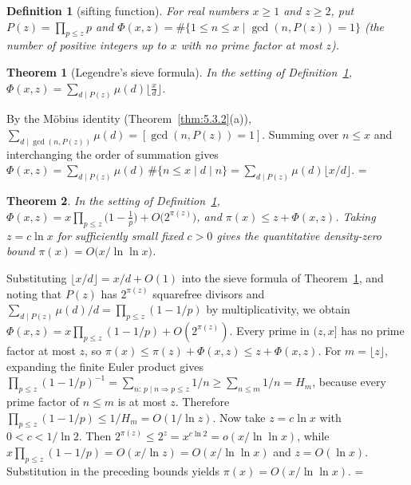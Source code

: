 \documentclass[11pt]{article}
\makeatletter
\let\nt@closedisplay\]
\def\nt@guardedclose{\@ifnextchar\par{\nt@closeafterpar}{\@ifnextchar\end{\postdisplaypenalty\@M\nt@closedisplay}{\nt@closedisplay}}}
\def\nt@closeafterpar\par{\@ifnextchar\par{\nt@closeafterpar}{\@ifnextchar\end{\postdisplaypenalty\@M\nt@closedisplay\par}{\nt@closedisplay\par}}}
\renewenvironment{proof}[1][\proofname]{\par
  \pushQED{\qed}\normalfont\topsep\medskipamount\edef\nt@afterproof{\@endparpenalty=\the\@endparpenalty\relax}\@beginparpenalty\@M\@endparpenalty\@M\let\]\nt@guardedclose\trivlist\item[]\textit{#1\@addpunct{.}} \ignorespaces}{\ifvmode\addpenalty\@M\fi\popQED\nt@afterproof\endtrivlist\@endpefalse}
\theoremstyle{ntstyle}
\newtheorem{theorem}{Theorem}[subsection]
\newtheorem{definition}{Definition}[subsection]
\makeatother
\begin{document}
\begin{definition}[sifting function]\label{def:9.7.1}\label{def:sifting-function}
  For real numbers
  $x\ge1$ and $z\ge2$, put $P(z)=\prod_{p\le z}p$ and $\Phi(x,z)=\#\{1\le n\le x \mid \gcd(n, P(z))=1\}$ (the
  number of positive integers up to $x$ with no prime factor at most $z$).

\end{definition}

\begin{theorem}[Legendre's sieve formula]\label{thm:9.7.1}\label{thm:legendre-sieve-formula}
  In the
  setting of Definition~\ref{def:9.7.1}, $\displaystyle\Phi(x,z)=\sum_{d\mid P(z)}\mu(d)\Big\lfloor\tfrac{x}{d}\Big\rfloor$.

\end{theorem}

\begin{proof} By the Möbius identity (Theorem~\ref{thm:5.3.2}(a)),
  $\sum_{d\mid\gcd(n, P(z))}\mu(d)=[\gcd(n, P(z))=1]$. Summing over $n\le x$ and interchanging the order of
  summation gives
  $\Phi(x,z)=\sum_{d\mid P(z)}\mu(d)\,\#\{n\le x \mid d\mid n\}=\sum_{d\mid P(z)}\mu(d)\lfloor x/d\rfloor$.
\end{proof}

\begin{theorem}\label{thm:9.7.2}
  In the setting of Definition~\ref{def:9.7.1},
  $\displaystyle\Phi(x,z)=x\prod_{p\le z}\Big(1-\tfrac{1}{p}\Big)+O\big(2^{\pi(z)}\big)$, and
  $\pi(x)\le z+\Phi(x,z)$. Taking $z=c\ln x$ for sufficiently small fixed $c>0$
  gives the quantitative density-zero bound $\pi(x)=O\big(x/\ln\ln x\big)$.

\end{theorem}

\begin{proof} Substituting $\lfloor x/d\rfloor=x/d+O(1)$ into the sieve formula of
  Theorem~\ref{thm:9.7.1}, and noting that $P(z)$ has $2^{\pi(z)}$ squarefree divisors
  and $\sum_{d\mid P(z)}\mu(d)/d=\prod_{p\le z}(1-1/p)$
  by multiplicativity, we obtain $\Phi(x,z)=x\prod_{p\le z}(1-1/p)+O(2^{\pi(z)})$.
  Every prime in $(z,x]$ has no prime factor at most $z$, so
  $\pi(x)\le\pi(z)+\Phi(x,z)\le z+\Phi(x,z)$. For $m=\lfloor z\rfloor$,
  expanding the finite Euler product gives
  $\prod_{p\le z}(1-1/p)^{-1}=\sum_{n:\,p\mid n\Rightarrow p\le z}1/n\ge\sum_{n\le m}1/n=H_m$, because every prime
  factor of $n\le m$ is at most $z$.
  Therefore $\prod_{p\le z}(1-1/p)\le1/H_m=O(1/\ln z)$. Now take
  $z=c\ln x$ with $0<c<1/\ln2$. Then
  $2^{\pi(z)}\le2^z=x^{c\ln2}=o(x/\ln\ln x)$, while $x\prod_{p\le z}(1-1/p)=O(x/\ln z)=O(x/\ln\ln x)$ and $z=O(\ln x)$.
  Substitution in the preceding bounds yields $\pi(x)=O(x/\ln\ln x)$.
\end{proof}
\end{document}
